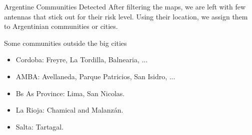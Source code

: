 \documentclass{beamer}
\begin{document}
\begin{frame}{Argentine Communities Detected}
	After filtering the maps, we are left with few antennas that stick out for their risk level. Using their location, we assign them to Argentinian communities or cities. 
	
	
	\bigskip
	
	\begin{block}{Some communities outside the big cities}
		\begin{itemize}
			\item Cordoba: Freyre, La Tordilla, Balnearia, ... %
			\item AMBA: Avellaneda, Parque Patricios, San Isidro, ... %
			\item Bs As Province: Lima, San Nicolas.
			\item La Rioja: Chamical and Malanz\'an.
			\item Salta: Tartagal.
		\end{itemize}
		
	\end{block}
\end{frame}

		
		
\end{document}
